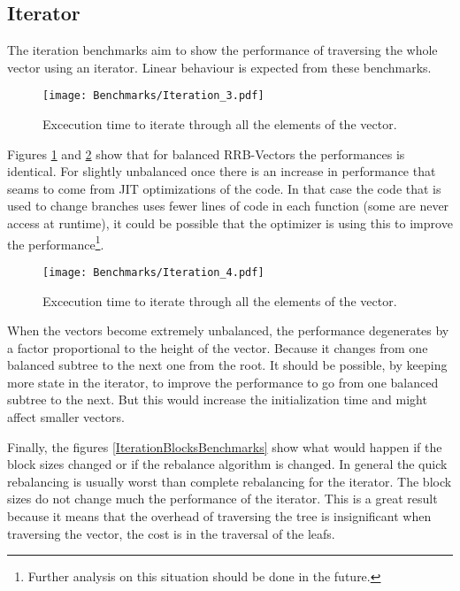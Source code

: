 \FloatBarrier

\clearpage
\subsection{Iterator}
The iteration benchmarks aim to show the performance of traversing the whole vector using an iterator. Linear behaviour is expected from these benchmarks.

\begin{figure}[h!]
  \centering
  \texttt{[image: Benchmarks/Iteration\_3.pdf]}
  \caption{Excecution time to iterate through all the elements of the vector.}
  \label{Iteration2Benchmarks}
\end{figure}

Figures \ref{Iteration2Benchmarks} and \ref{Iteration3Benchmarks} show that for balanced RRB-Vectors the performances is identical. For slightly unbalanced once there is an increase in performance that seams to come from JIT optimizations of the code. In that case the code that is used to change branches uses fewer lines of code in each function (some are never access at runtime), it could be possible that the optimizer is using this to improve the performance\footnote{Further analysis on this situation should be done in the future.}. 

\begin{figure}[h!]
  \centering
  \texttt{[image: Benchmarks/Iteration\_4.pdf]}
  \caption{Excecution time to iterate through all the elements of the vector.}
  \label{Iteration3Benchmarks}
\end{figure}

When the vectors become extremely unbalanced, the performance degenerates by a factor proportional to the height of the vector. Because it changes from one balanced subtree to the next one from the root. It should be possible, by keeping more state in the iterator, to improve the performance to go from one balanced subtree to the next. But this would increase the initialization time and might affect smaller vectors.

\FloatBarrier

Finally, the figures \ref{IterationBlocksBenchmarks} show what would happen if the block sizes changed or if the rebalance algorithm is changed. In general the quick rebalancing is usually worst than complete rebalancing for the iterator. The block sizes do not change much the performance of the iterator. This is a great result because it means that the overhead of traversing the tree is insignificant when traversing the vector, the cost is in the traversal of the leafs.

